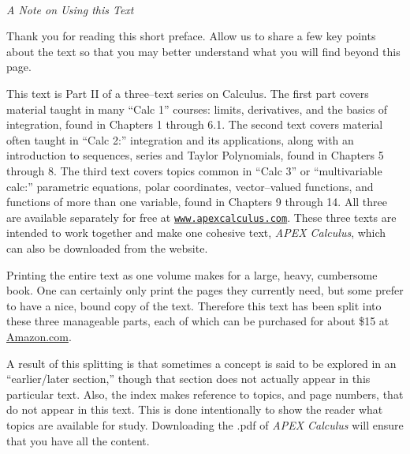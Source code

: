\thispagestyle{empty}
\Huge
{}\\
\large
\emph{A Note on Using this Text}
\baselineskip
\normalsize

Thank you for reading this short preface. Allow us to share a few key points about the text so that you may better understand what you will find beyond this page.

This text is Part II of a three--text series on Calculus. The first part covers material taught in many ``Calc 1'' courses: limits, derivatives, and the basics of integration, found in Chapters 1 through 6.1. The second text covers material often taught in ``Calc 2:'' integration and its applications, along with an introduction to sequences, series and Taylor Polynomials, found in Chapters 5 through 8. The third text covers topics common in ``Calc 3'' or ``multivariable calc:'' parametric equations, polar coordinates, vector--valued functions, and functions of more than one variable, found in Chapters 9 through 14. All three are available separately for free at \texttt{\href{http://apexcalculus.com}{www.apexcalculus.com}}.  These three texts are intended to work together and make one cohesive text, \textit{APEX Calculus}, which can also be downloaded from the website. 

Printing the entire text as one volume makes for a large, heavy, cumbersome book. One can certainly only print the pages they currently need, but some prefer to have a nice, bound copy of the text. Therefore this text has been split into these three manageable parts, each of which can be purchased for about \$15 at \href{http://amazon.com}{Amazon.com}. 

A result of this splitting is that sometimes a concept is said to be explored in an ``earlier/later section,'' though that section does not actually appear in this particular text. Also, the index makes reference to topics, and page numbers, that do not appear in this text. This is done intentionally to show the reader what topics are available for study.  Downloading the .pdf of \textit{APEX Calculus} will ensure that you have all the content.\\ 

